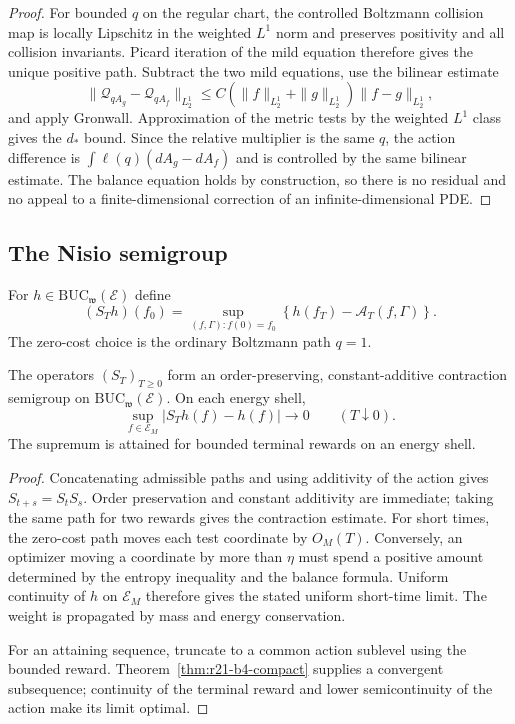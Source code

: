 \begin{proof}
For bounded $q$ on the regular chart, the controlled Boltzmann collision map
is locally Lipschitz in the weighted $L^1$ norm and preserves positivity and
all collision invariants.  Picard iteration of the mild equation therefore
gives the unique positive path.  Subtract the two mild equations, use the
bilinear estimate
\[
 \|\mathcal Q_{qA_g}-\mathcal Q_{qA_f}\|_{L^1_2}
 \le C(\|f\|_{L^1_2}+\|g\|_{L^1_2})\|f-g\|_{L^1_2},
\]
and apply Gronwall.  Approximation of the metric tests by the weighted
$L^1$ class gives the $d_*$ bound.  Since the relative multiplier is the same
$q$, the action difference is
$\int\ell(q)(dA_g-dA_f)$ and is controlled by the same bilinear estimate.
The balance equation holds by construction, so there is no residual and no
appeal to a finite-dimensional correction of an infinite-dimensional PDE.
\end{proof}

\subsection{The Nisio semigroup}

For $h\in\mathrm{BUC}_{\mathfrak w}(\mathcal E)$ define
\[
 (S_Th)(f_0)=\sup_{(f,\Gamma):f(0)=f_0}
 \left\{h(f_T)-\mathcal A_T(f,\Gamma)\right\}.
\]
The zero-cost choice is the ordinary Boltzmann path $q=1$.

\begin{theorem}
\label{thm:r21-b4-nisio}
The operators $(S_T)_{T\ge0}$ form an order-preserving, constant-additive
contraction semigroup on $\mathrm{BUC}_{\mathfrak w}(\mathcal E)$.  On each
energy shell,
\[
 \sup_{f\in\mathcal E_M}|S_Th(f)-h(f)|\longrightarrow0
 \qquad(T\downarrow0).
\]
The supremum is attained for bounded terminal rewards on an energy shell.
\end{theorem}

\begin{proof}
Concatenating admissible paths and using additivity of the action gives
$S_{t+s}=S_tS_s$.  Order preservation and constant additivity are immediate;
taking the same path for two rewards gives the contraction estimate.  For
short times, the zero-cost path moves each test coordinate by $O_M(T)$.
Conversely, an optimizer moving a coordinate by more than $\eta$ must spend a
positive amount determined by the entropy inequality and the balance formula.
Uniform continuity of $h$ on $\mathcal E_M$ therefore gives the stated
uniform short-time limit.  The weight is propagated by mass and energy
conservation.

For an attaining sequence, truncate to a common action sublevel using the
bounded reward.  Theorem~\ref{thm:r21-b4-compact} supplies a convergent
subsequence; continuity of the terminal reward and lower semicontinuity of the
action make its limit optimal.
\end{proof}

